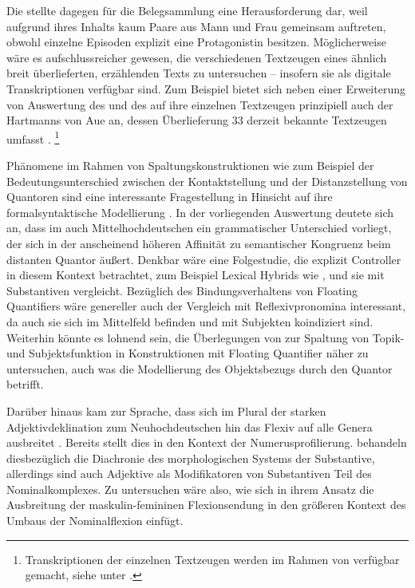Die \KC{} stellte dagegen für die Belegsammlung eine Herausforderung
dar, weil aufgrund ihres Inhalts kaum Paare aus Mann und Frau gemeinsam
auftreten, obwohl einzelne Episoden explizit eine Protagonistin besitzen.
Möglicherweise wäre es aufschlussreicher gewesen, die verschiedenen Textzeugen
eines ähnlich breit überlieferten, erzählenden Texts zu untersuchen -- insofern
sie als digitale Transkriptionen verfügbar sind. Zum Beispiel bietet sich neben
einer Erweiterung von  Auswertung des
 und des  auf ihre einzelnen Textzeugen prinzipiell
auch der  Hartmanns von Aue an, dessen Überlieferung 33 derzeit
bekannte Textzeugen umfasst \autocites[vgl.][s.\,v.~\textit{Hartmann von Aue:
}]{hsc}.%
%
	\footnote{Transkriptionen der einzelnen Textzeugen werden im Rahmen von
		 verfügbar gemacht, siehe unter
		.%
	}

Phänomene im Rahmen von Spaltungskonstruktionen wie zum Beispiel der
Bedeutungs\-unterschied zwischen der Kontaktstellung und der Distanzstellung
von Quantoren sind eine interessante Fragestellung in Hinsicht auf ihre
formal\-syntaktische Modellierung \autocite[siehe
z.\,B.][]{pittner1995,merchant1996,fanselowcavar2002,nolda2007,shen2019}. In
der vorliegenden Auswertung deutete sich an, dass im auch Mittelhochdeutschen
ein grammatischer Unterschied vorliegt, der sich in der anscheinend höheren
Affinität zu semantischer Kongruenz beim distanten Quantor äußert. Denkbar wäre
eine Folgestudie, die explizit  Controller in diesem Kontext
betrachtet, zum Beispiel Lexical Hybrids wie  ,
und sie mit  Substantiven vergleicht. Bezüglich des
Bindungsverhaltens von Floating Quantifiers wäre genereller auch der Vergleich
mit Reflexivpronomina interessant, da auch sie sich im Mittelfeld befinden und
mit Subjekten koindiziert sind. Weiterhin könnte es lohnend sein, die
Überlegungen von \citet{spector2009} zur Spaltung von Topik- und
Subjektsfunktion in Konstruktionen mit Floating Quantifier näher zu
untersuchen, auch was die Modellierung des Objektsbezugs durch den Quantor
betrifft.

Darüber hinaus kam zur Sprache, dass sich im Plural der starken
Adjektivdeklination zum Neuhochdeutschen hin das Flexiv  auf alle
Genera ausbreitet \autocite[vgl.][191--192]{reichmannwegera1993}. Bereits
\citet{askedal1973} stellt dies in den Kontext der Numerusprofilierung.
\citet{dammelgillmann2014} behandeln diesbezüglich die Diachronie des
morphologischen Systems der Substantive, allerdings sind auch Adjektive als
Modifikatoren von Substantiven Teil des Nominalkomplexes. Zu untersuchen wäre
also, wie sich in ihrem Ansatz die Ausbreitung der maskulin-femininen
Flexionsendung in den größeren Kontext des Umbaus der Nominal\-flexion einfügt.

